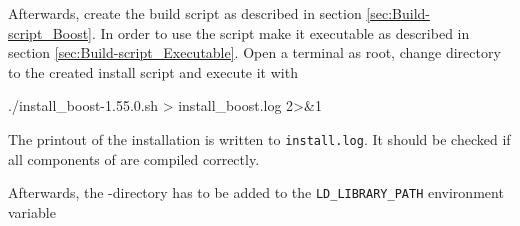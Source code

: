 Afterwards, create the \marktool{\boostname} build script as described in section \ref{sec:Build-script_Boost}. In order to use the script make it executable as described in section \ref{sec:Build-script_Executable}. Open a terminal as root, change directory to the created install script and execute it with

\begin{code}
./install_boost-1.55.0.sh > install_boost.log 2>&1
\end{code}

The printout of the installation is written to \verb+install.log+. It should be checked if all components of \marktool{\boostname} are compiled correctly.

%
%

Afterwards, the \marktool{\boostname}-directory has to be added to the \verb+LD_LIBRARY_PATH+ environment variable

\begingroup
\lstset{breaklines = true}

\endgroup 
